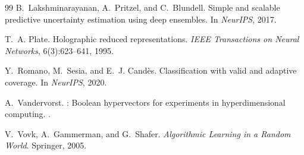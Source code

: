 \documentclass[11pt]{article}
\begin{document}
\begin{thebibliography}{99}
B.~Lakshminarayanan, A.~Pritzel, and C.~Blundell.
\newblock Simple and scalable predictive uncertainty estimation using deep ensembles.
\newblock In \textit{NeurIPS}, 2017.

T.~A. Plate.
\newblock Holographic reduced representations.
\newblock \textit{IEEE Transactions on Neural Networks}, 6(3):623--641, 1995.

Y.~Romano, M.~Sesia, and E.~J. Cand\`{e}s.
\newblock Classification with valid and adaptive coverage.
\newblock In \textit{NeurIPS}, 2020.

A.~Vandervorst.
: Boolean hypervectors for experiments in hyperdimensional computing.
.

V.~Vovk, A.~Gammerman, and G.~Shafer.
\newblock \textit{Algorithmic Learning in a Random World}.
\newblock Springer, 2005.

\end{thebibliography}
\end{document}
